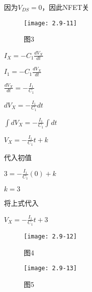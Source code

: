 \color{black}{
	
}


\scalebox{3}{（c）}

因为$V_{DS}=0$，因此NFET关

		\begin{figure}[H] %
	\begin{minipage}{\linewidth}
		\texttt{[image: 2.9-11]}
	\end{minipage}
	\caption*{图3} %
\end{figure}



\color{black}{
	
}

\scalebox{3}{（d）}

$I_X=-C_1\frac{dV_X}{dt}$

$I_1=-C_1\frac{dV_X}{dt}$

$\frac{dV_X}{dt}=-\frac{I_1}{C_1}$

$dV_X=-\frac{I_1}{C_1}dt$

$\int dV_X=-\frac{I_1}{C_1} \int dt$

$V_X=-\frac{I_1}{C_1}t+k$

代入初值

$3=-\frac{I_1}{C_1}(0)+k$

$k=3$

将上式代入

$V_X=-\frac{I_1}{C_1}t+3$

		\begin{figure}[H] %
	\begin{minipage}{\linewidth}
		\texttt{[image: 2.9-12]}
	\end{minipage}
	\caption*{图4} %
\end{figure}

\scalebox{3}{（e）}

		\begin{figure}[H] %
	\begin{minipage}{\linewidth}
		\texttt{[image: 2.9-13]}
	\end{minipage}
	\caption*{图5} %
\end{figure}


